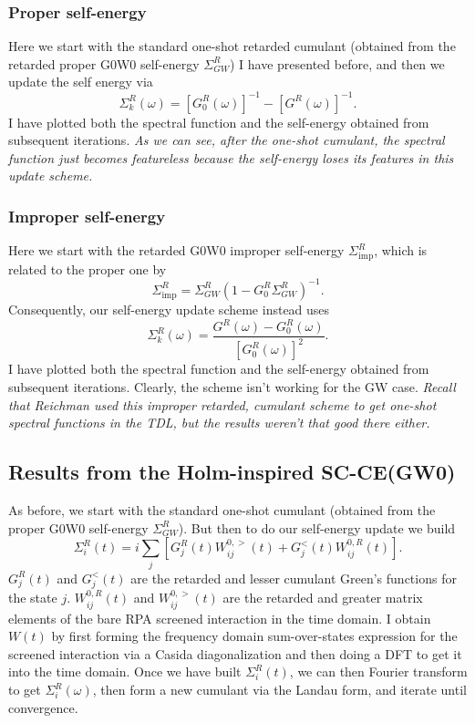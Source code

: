 \subsubsection{Proper self-energy}
Here we start with the standard one-shot retarded cumulant (obtained from the retarded proper G0W0 self-energy $\Sigma^R_{GW}$) I have presented before, and then we update the self energy via 
\begin{equation}
    \Sigma^R_k(\omega ) = \left[G_0^R(\omega )\right]^{-1} - \left[G^R(\omega )\right]^{-1}.
\end{equation}
I have plotted both the spectral function and the self-energy obtained from subsequent iterations. \emph{As we can see, after the one-shot cumulant, the spectral function just becomes featureless because the self-energy loses its features in this update scheme. }
\subsubsection{Improper self-energy}
Here we start with the retarded G0W0 improper self-energy $\Sigma^R_{\mathrm{imp}}$, which is related to the proper one by 
\begin{equation}
    \Sigma^R_{\mathrm{imp}}=\Sigma^R_{G W}\left(1-G_0^R \Sigma^R_{G W}\right)^{-1}.
\end{equation}
Consequently, our self-energy update scheme instead uses
\begin{equation}
    \Sigma^R_k(\omega ) = \frac{G^R(\omega)-G_0^R(\omega)}{\left[G_0^R(\omega)\right]^2}.
\end{equation}
I have plotted both the spectral function and the self-energy obtained from subsequent iterations. Clearly, the scheme isn't working for the GW case. \emph{Recall that Reichman used this improper retarded, cumulant scheme to get one-shot spectral functions in the TDL, but the results weren't that good there either. }
\subsection{Results from the Holm-inspired SC-CE(GW0)}
As before, we start with the standard one-shot cumulant (obtained from the proper G0W0 self-energy $\Sigma^R_{GW}$). But then to do our self-energy update we build
\begin{equation}
    \Sigma_i^R(t)=i \sum_j\left[G_j^R(t) W_{i j}^{0,>}(t)+G_j^{<}(t) W_{i j}^{0, R}(t)\right].
\end{equation}
$G_j^R(t)$ and $G_j^{<}(t)$ are the retarded and lesser cumulant Green's functions for the state $j$. $W_{ij}^{0,R}(t)$ and $W_{ij}^{0,>}(t)$ are the retarded and greater matrix elements of the bare RPA screened interaction in the time domain. I obtain $W(t)$ by first forming the frequency domain sum-over-states expression for the screened interaction via a Casida diagonalization and then doing a DFT to get it into the time domain. Once we have built $\Sigma_i^R(t)$, we can then Fourier transform to get $\Sigma_i^R(\omega)$, then form a new cumulant via the Landau form, and iterate until convergence.
